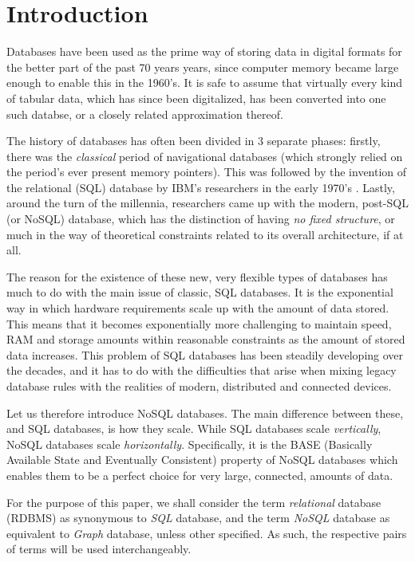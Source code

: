 \documentclass[10pt,        %
               a4paper,     %
               journal,     %
               ]{IEEEtran}
\begin{document}
\section{Introduction}
Databases have been used as the prime way of storing data in digital formats for the better part of the past 70 years years, since computer memory became large enough to enable this in the 1960's. It is safe to assume that virtually every kind of tabular data, which has since been digitalized, has been converted into one such databse, or a closely related approximation thereof. \cite{bachman_1973} \par
The history of databases has often been divided in 3 separate phases: firstly, there was the \textit{classical} period of navigational databases (which strongly relied on the period's ever present memory pointers). This was followed by the invention of the relational (SQL) database by IBM's researchers in the early 1970's \cite{codd_1970}. Lastly, around the turn of the millennia, researchers came up with the modern, post-SQL (or NoSQL) database, which has the distinction of having \textit{no fixed structure}, or much in the way of theoretical constraints related to its overall architecture, if at all. \par
The reason for the existence of these new, very flexible types of databases has much to do with the main issue of classic, SQL databases. It is the exponential way in which hardware requirements scale up with the amount of data stored. This means that it becomes exponentially more challenging to maintain speed, RAM and storage amounts within reasonable constraints as the amount of stored data increases. This problem of SQL databases has been steadily developing over the decades, and it has to do with the difficulties that arise when mixing legacy database rules with the realities of modern, distributed and connected devices. \cite{IEEEpaper1:comparison} \par
Let us therefore introduce NoSQL databases. The main difference between these, and SQL databases, is how they scale. While SQL databases scale \textit{vertically}, NoSQL databases scale \textit{horizontally}. Specifically, it is the BASE (Basically Available State and Eventually Consistent) property of NoSQL databases which enables them to be a perfect choice for very large, connected, amounts of data. \par
For the purpose of this paper, we shall consider the term \textit{relational} database (RDBMS) as synonymous to \textit{SQL} database, and the term \textit{NoSQL} database as equivalent to \textit{Graph} database, unless other specified. As such, the respective pairs of terms will be used interchangeably. \par
\end{document}
